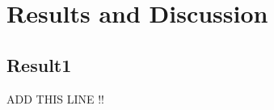 \section{Results and Discussion}\label{sec:result}
\subsection{Result1}\label{subsec:result1}

ADD THIS LINE !!

\lipsum[1-5]




